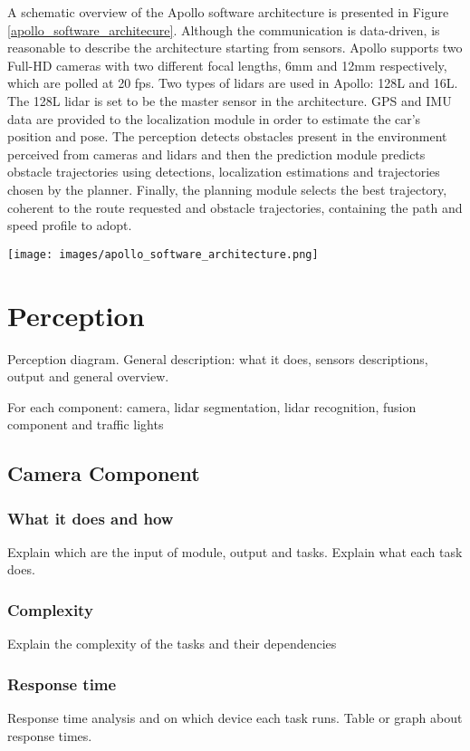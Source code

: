 \documentclass[conference]{IEEEtran}
\begin{document}
A schematic overview of the Apollo software architecture is presented in Figure \ref{apollo_software_architecure}.
Although the communication is data-driven, is reasonable to describe the architecture starting from sensors.
Apollo supports two Full-HD cameras with two different focal lengths, 6mm and 12mm respectively, which are polled at 20 fps.
Two types of lidars are used in Apollo: 128L and 16L. The 128L lidar is set to be the master sensor in the architecture.
GPS and IMU data are provided to the localization module in order to estimate the car's position and pose.
The perception detects obstacles present in the environment perceived from cameras and lidars and then the prediction module predicts obstacle trajectories using detections, localization estimations and trajectories chosen by the planner.
Finally, the planning module selects the best trajectory, coherent to the route requested and obstacle trajectories, containing the path and speed profile to adopt.

\begin{figure*}[t]
    \centering
    \texttt{[image: images/apollo\_software\_architecture.png]}
    \caption{Apollo Software Architecture}
    \label{apollo_software_architecure}
\end{figure*}

\section{Perception}
Perception diagram.
General description: what it does, sensors descriptions, output and general overview.

For each component: camera, lidar segmentation, lidar recognition, fusion component and traffic lights

\subsection{Camera Component}

\subsubsection{What it does and how}
Explain which are the input of module, output and tasks.
Explain what each task does.
\subsubsection{Complexity}
Explain the complexity of the tasks and their dependencies
\subsubsection{Response time}
Response time analysis and on which device each task runs.
Table or graph about response times.
\end{document}
